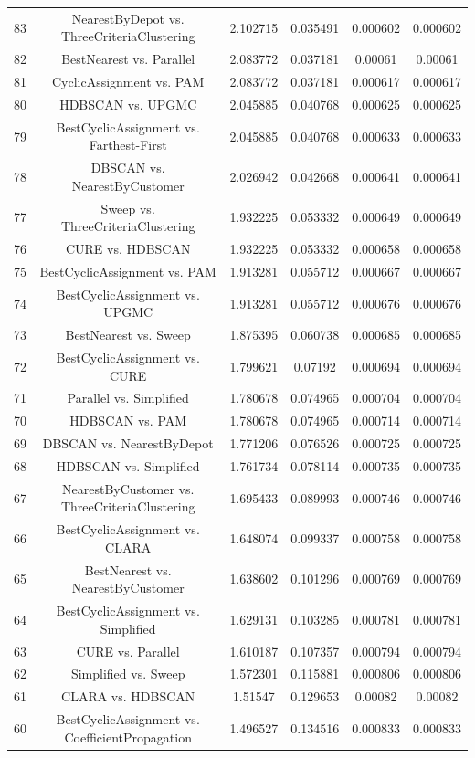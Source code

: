 \documentclass[a4paper,10pt]{article}
\begin{document}
\begin{landscape}
\begin{table}[!htp]
\begin{tabular}{cccccc}
83&NearestByDepot vs. ThreeCriteriaClustering&2.102715&0.035491&0.000602&0.000602\\
82&BestNearest vs. Parallel&2.083772&0.037181&0.00061&0.00061\\
81&CyclicAssignment vs. PAM&2.083772&0.037181&0.000617&0.000617\\
80&HDBSCAN vs. UPGMC&2.045885&0.040768&0.000625&0.000625\\
79&BestCyclicAssignment vs. Farthest-First&2.045885&0.040768&0.000633&0.000633\\
78&DBSCAN vs. NearestByCustomer&2.026942&0.042668&0.000641&0.000641\\
77&Sweep vs. ThreeCriteriaClustering&1.932225&0.053332&0.000649&0.000649\\
76&CURE vs. HDBSCAN&1.932225&0.053332&0.000658&0.000658\\
75&BestCyclicAssignment vs. PAM&1.913281&0.055712&0.000667&0.000667\\
74&BestCyclicAssignment vs. UPGMC&1.913281&0.055712&0.000676&0.000676\\
73&BestNearest vs. Sweep&1.875395&0.060738&0.000685&0.000685\\
72&BestCyclicAssignment vs. CURE&1.799621&0.07192&0.000694&0.000694\\
71&Parallel vs. Simplified&1.780678&0.074965&0.000704&0.000704\\
70&HDBSCAN vs. PAM&1.780678&0.074965&0.000714&0.000714\\
69&DBSCAN vs. NearestByDepot&1.771206&0.076526&0.000725&0.000725\\
68&HDBSCAN vs. Simplified&1.761734&0.078114&0.000735&0.000735\\
67&NearestByCustomer vs. ThreeCriteriaClustering&1.695433&0.089993&0.000746&0.000746\\
66&BestCyclicAssignment vs. CLARA&1.648074&0.099337&0.000758&0.000758\\
65&BestNearest vs. NearestByCustomer&1.638602&0.101296&0.000769&0.000769\\
64&BestCyclicAssignment vs. Simplified&1.629131&0.103285&0.000781&0.000781\\
63&CURE vs. Parallel&1.610187&0.107357&0.000794&0.000794\\
62&Simplified vs. Sweep&1.572301&0.115881&0.000806&0.000806\\
61&CLARA vs. HDBSCAN&1.51547&0.129653&0.00082&0.00082\\
60&BestCyclicAssignment vs. CoefficientPropagation&1.496527&0.134516&0.000833&0.000833\\

\end{tabular}
\end{table}
\end{landscape}
\end{document}
